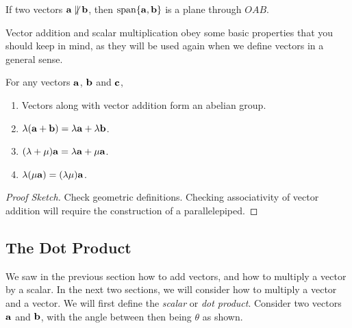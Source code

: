 \documentclass[a4paper]{scrartcl}
\begin{document}
If two vectors $\mathbf{a} \not \parallel \mathbf{b}$, then $\operatorname{span}\{\mathbf{a}, \mathbf{b}\}$ is a plane through $OAB$.

Vector addition and scalar multiplication obey some basic properties that you should keep in mind, as they will be used again when we define vectors in a general sense.

\begin{proposition}
For any vectors $\mathbf{a}$, $\mathbf{b}$ and $\mathbf{c}$,
\begin{enumerate}[label=(\roman*)]
	\item Vectors along with vector addition form an abelian group.
	\item $\lambda(\mathbf{a} + \mathbf{b}) = \lambda \mathbf{a} + \lambda \mathbf{b}$.
	\item $(\lambda + \mu)\mathbf{a} = \lambda\mathbf{a} + \mu\mathbf{a}$.
	\item $\lambda(\mu \mathbf{a}) = (\lambda \mu) \mathbf{a}$.
\end{enumerate}
\end{proposition}
\begin{proof}[Proof Sketch]
	Check geometric definitions. Checking associativity of vector addition will require the construction of a parallelepiped.
\end{proof}


\subsection{The Dot Product}

We saw in the previous section how to add vectors, and how to multiply a vector by a scalar. In the next two sections, we will consider how to multiply a vector and a vector. 
We will first define the \emph{scalar} or \emph{dot product}.
Consider two vectors $\mathbf{a}$ and $\mathbf{b}$, with the angle between then being $\theta$ as shown.

\begin{center}
  \end{center}
\end{document}
